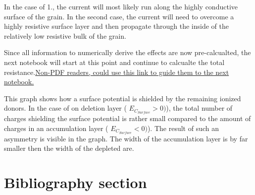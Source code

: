 \documentclass[11pt]{article}
\begin{document}
In the case of 1., the current will most likely run along the highly
conductive surface of the grain. In the second case, the current will
need to overcome a highly resistive surface layer and then propagate
through the inside of the relatively low resistive bulk of the grain.

Since all information to numerically derive the effects are now
pre-calcualted, the next notebook will start at this point and continue
to calcualte the total
resistance.\href{./2.1-From_smox_grain_to_resistance.ipynb}{Non-PDF
readers, could use this link to guide them to the next notebook.}

    This graph shows how a surface potential is shielded by the remaining
ionized donors. In the case of on deletion layer (
\(E_{C_{Surface}}>0 )\)), the total number of charges shielding the
surface potential is rather small compared to the amount of charges in
an accumulation layer ( \(E_{C_{Surface}}<0 )\)). The result of such an
asymmetry is visible in the graph. The width of the accumulation layer
is by far smaller then the width of the depleted are.

    \hypertarget{bibliography-section}{%
\section{Bibliography section}\label{bibliography-section}}

    



    
    
    
\end{document}
